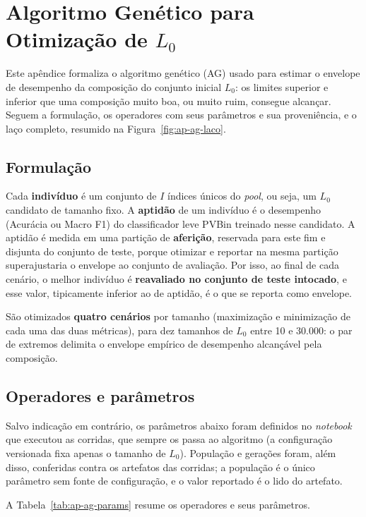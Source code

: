 \chapter{Algoritmo Genético para Otimização de \texorpdfstring{$L_0$}{L0}}
\label{ap:ag}

Este apêndice formaliza o algoritmo genético (AG) usado para estimar o
envelope de desempenho da composição do conjunto inicial $L_0$: os limites
superior e inferior que uma composição muito boa, ou muito ruim, consegue
alcançar. Seguem a formulação, os operadores com seus parâmetros e sua
proveniência, e o laço completo, resumido na Figura~\ref{fig:ap-ag-laco}.

\section{Formulação}

Cada \textbf{indivíduo} é um conjunto de $I$ índices únicos do
\textit{pool}, ou seja, um $L_0$ candidato de tamanho fixo. A
\textbf{aptidão} de um indivíduo é o desempenho (Acurácia ou Macro F1) do
classificador leve PVBin treinado nesse candidato. A aptidão é medida em
uma partição de \textbf{aferição}, reservada para este fim e disjunta do
conjunto de teste, porque
otimizar e reportar na mesma partição superajustaria o envelope ao conjunto
de avaliação. Por isso, ao final de cada cenário, o melhor
indivíduo é \textbf{reavaliado no conjunto de teste intocado}, e esse valor,
tipicamente inferior ao de aptidão, é o que se reporta como envelope.

São otimizados \textbf{quatro cenários} por tamanho (maximização e
minimização de cada uma das duas métricas), para dez tamanhos de $L_0$
entre 10 e 30.000: o par de extremos delimita o envelope empírico de
desempenho alcançável pela composição.

\section{Operadores e parâmetros}

Salvo indicação em contrário, os parâmetros abaixo foram definidos no
\textit{notebook} que executou as corridas, que sempre os passa ao
algoritmo (a configuração versionada fixa apenas o tamanho de $L_0$).
População e gerações foram, além disso, conferidas contra os artefatos das
corridas; a população é o único parâmetro sem fonte de configuração, e o
valor reportado é o lido do artefato.

A Tabela~\ref{tab:ap-ag-params} resume os operadores e seus parâmetros.

